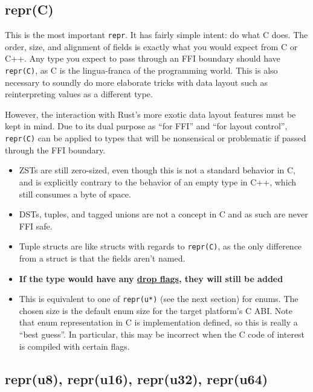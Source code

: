 \documentclass[a4paper,]{book}
\begin{document}
\subsection{repr(C)}\label{reprc}

This is the most important \texttt{repr}. It has fairly simple intent:
do what C does. The order, size, and alignment of fields is exactly what
you would expect from C or C++. Any type you expect to pass through an
FFI boundary should have \texttt{repr(C)}, as C is the lingua-franca of
the programming world. This is also necessary to soundly do more
elaborate tricks with data layout such as reinterpreting values as a
different type.

However, the interaction with Rust's more exotic data layout features
must be kept in mind. Due to its dual purpose as ``for FFI'' and ``for
layout control'', \texttt{repr(C)} can be applied to types that will be
nonsensical or problematic if passed through the FFI boundary.

\begin{itemize}
\item
  ZSTs are still zero-sized, even though this is not a standard behavior
  in C, and is explicitly contrary to the behavior of an empty type in
  C++, which still consumes a byte of space.
\item
  DSTs, tuples, and tagged unions are not a concept in C and as such are
  never FFI safe.
\item
  Tuple structs are like structs with regards to \texttt{repr(C)}, as
  the only difference from a struct is that the fields aren't named.
\item
  \textbf{If the type would have any
  \protect\hyperlink{sec--drop-flags}{drop flags}, they will still be
  added}
\item
  This is equivalent to one of \texttt{repr(u*)} (see the next section)
  for enums. The chosen size is the default enum size for the target
  platform's C ABI. Note that enum representation in C is implementation
  defined, so this is really a ``best guess''. In particular, this may
  be incorrect when the C code of interest is compiled with certain
  flags.
\end{itemize}

\subsection{repr(u8), repr(u16), repr(u32),
repr(u64)}\label{repru8-repru16-repru32-repru64}
\end{document}
